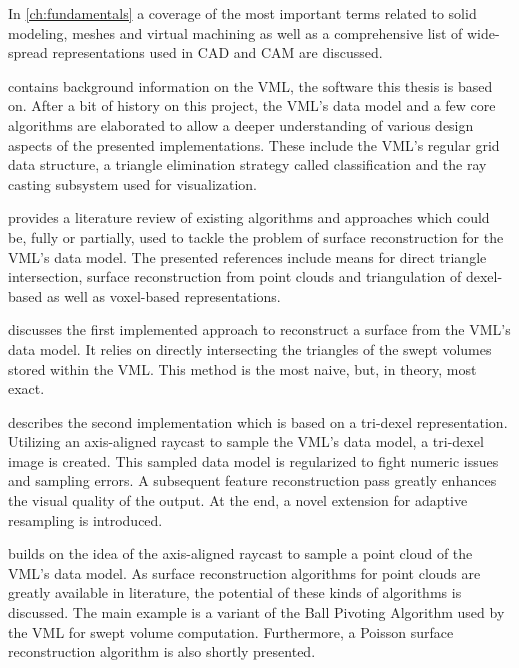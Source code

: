 In \cref{ch:fundamentals} a coverage of the most important terms related to solid modeling, meshes and virtual machining as well as a comprehensive list of wide-spread representations used in CAD and CAM are discussed.

 contains background information on the VML, the software this thesis is based on.
After a bit of history on this project, the VML's data model and a few core algorithms are elaborated to allow a deeper understanding of various design aspects of the presented implementations. These include the VML's regular grid data structure, a triangle elimination strategy called classification and the ray casting subsystem used for visualization.

 provides a literature review of existing algorithms and approaches which could be, fully or partially, used to tackle the problem of surface reconstruction for the VML's data model.
The presented references include means for direct triangle intersection, surface reconstruction from point clouds and triangulation of dexel-based as well as voxel-based representations.

 discusses the first implemented approach to reconstruct a surface from the VML's data model.
It relies on directly intersecting the triangles of the swept volumes stored within the VML.
This method is the most naive, but, in theory, most exact.

 describes the second implementation which is based on a tri-dexel representation.
Utilizing an axis-aligned raycast to sample the VML's data model, a tri-dexel image is created.
This sampled data model is regularized to fight numeric issues and sampling errors.
A subsequent feature reconstruction pass greatly enhances the visual quality of the output.
At the end, a novel extension for adaptive resampling is introduced.

 builds on the idea of the axis-aligned raycast to sample a point cloud of the VML's data model.
As surface reconstruction algorithms for point clouds are greatly available in literature, the potential of these kinds of algorithms is discussed.
The main example is a variant of the Ball Pivoting Algorithm used by the VML for swept volume computation.
Furthermore, a Poisson surface reconstruction algorithm is also shortly presented.

